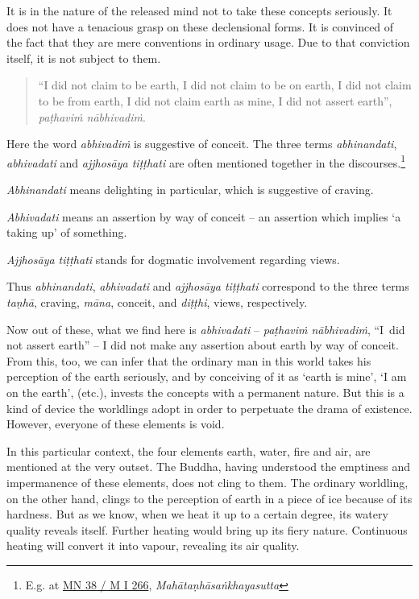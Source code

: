 It is in the nature of the released mind not to take these concepts seriously. It does not have a tenacious grasp on these declensional forms. It is convinced of the fact that they are mere conventions in ordinary usage. Due to that conviction itself, it is not subject to them.

\begin{quote}
``I did not claim to be earth, I did not claim to be on earth, I did not claim to be from earth, I did not claim earth as mine, I did not assert earth'', \emph{paṭhaviṁ nābhivadiṁ}.
\end{quote}

Here the word \emph{abhivadiṁ} is suggestive of conceit. The three terms \emph{abhinandati}, \emph{abhivadati} and \emph{ajjhosāya tiṭṭhati} are often mentioned together in the discourses.\footnote{E.g. at \href{https://suttacentral.net/mn38/pli/ms}{MN 38 / M I 266}, \emph{Mahātaṇhāsaṅkhayasutta}}

\emph{Abhinandati} means delighting in particular, which is suggestive of craving.

\emph{Abhivadati} means an assertion by way of conceit -- an assertion which implies `a taking up' of something.

\emph{Ajjhosāya tiṭṭhati} stands for dogmatic involvement regarding views.

Thus \emph{abhinandati}, \emph{abhivadati} and \emph{ajjhosāya tiṭṭhati} correspond to the three terms \emph{taṇhā}, craving, \emph{māna}, conceit, and \emph{diṭṭhi}, views, respectively.

Now out of these, what we find here is \emph{abhivadati} -- \emph{paṭhaviṁ nābhivadiṁ}, ``I~did not assert earth'' -- I did not make any assertion about earth by way of conceit. From this, too, we can infer that the ordinary man in this world takes his perception of the earth seriously, and by conceiving of it as `earth is mine', `I am on the earth', (etc.), invests the concepts with a permanent nature. But this is a kind of device the worldlings adopt in order to perpetuate the drama of existence. However, everyone of these elements is void.

In this particular context, the four elements earth, water, fire and air, are mentioned at the very outset. The Buddha, having understood the emptiness and impermanence of these elements, does not cling to them. The ordinary worldling, on the other hand, clings to the perception of earth in a piece of ice because of its hardness. But as we know, when we heat it up to a certain degree, its watery quality reveals itself. Further heating would bring up its fiery nature. Continuous heating will convert it into vapour, revealing its air quality.


